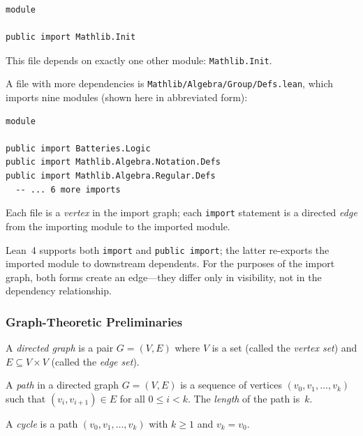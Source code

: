 \begin{verbatim}
module

public import Mathlib.Init
\end{verbatim}

\noindent
This file depends on exactly one other module: \texttt{Mathlib.Init}.

A file with more dependencies is \texttt{Mathlib/Algebra/Group/Defs.lean}, which imports nine modules (shown here in abbreviated form):

\begin{verbatim}
module

public import Batteries.Logic
public import Mathlib.Algebra.Notation.Defs
public import Mathlib.Algebra.Regular.Defs
  -- ... 6 more imports
\end{verbatim}

\noindent
Each file is a \emph{vertex} in the import graph; each \texttt{import} statement is a directed \emph{edge} from the importing module to the imported module.

Lean~4 supports both \texttt{import} and \texttt{public import}; the latter re-exports the imported module to downstream dependents. For the purposes of the import graph, both forms create an edge—they differ only in visibility, not in the dependency relationship.

\subsubsection{Graph-Theoretic Preliminaries}

\begin{definition}
A \emph{directed graph} is a pair $G = (V, E)$ where $V$ is a set (called the \emph{vertex set}) and $E \subseteq V \times V$ (called the \emph{edge set}).
\end{definition}

\begin{definition}[Path]
A \emph{path} in a directed graph $G = (V, E)$ is a sequence of vertices $(v_0, v_1, \ldots, v_k)$ such that $(v_i, v_{i+1}) \in E$ for all $0 \le i < k$. The \emph{length} of the path is~$k$.
\end{definition}

\begin{definition}[Cycle]
A \emph{cycle} is a path $(v_0, v_1, \ldots, v_k)$ with $k \geq 1$ and $v_k = v_0$.
\end{definition}

